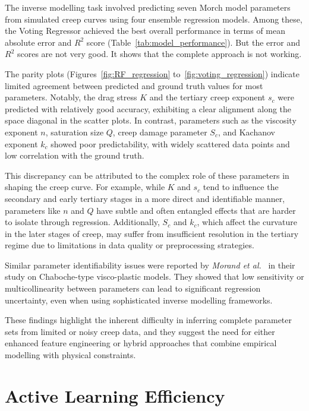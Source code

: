 \documentclass[class=scrbook, crop=false]{standalone}
\begin{document}
The inverse modelling task involved predicting seven Morch model parameters from simulated creep curves using four ensemble regression models. Among these, the Voting Regressor achieved the best overall performance in terms of mean absolute error and $R^2$ score (Table~\ref{tab:model_performance}). But the error and $R^2$ scores are not very good. It shows that the complete approach is not working. 

The parity plots (Figures~\ref{fig:RF_regression} to~\ref{fig:voting_regression}) indicate limited agreement between predicted and ground truth values for most parameters. Notably, the drag stress $K$ and the tertiary creep exponent $s_c$ were predicted with relatively good accuracy, exhibiting a clear alignment along the space diagonal in the scatter plots. In contrast, parameters such as the viscosity exponent $n$, saturation size $Q$, creep damage parameter $S_c$, and Kachanov exponent $k_c$ showed poor predictability, with widely scattered data points and low correlation with the ground truth.

This discrepancy can be attributed to the complex role of these parameters in shaping the creep curve. For example, while $K$ and $s_c$ tend to influence the secondary and early tertiary stages in a more direct and identifiable manner, parameters like $n$ and $Q$ have subtle and often entangled effects that are harder to isolate through regression. Additionally, $S_c$ and $k_c$, which affect the curvature in the later stages of creep, may suffer from insufficient resolution in the tertiary regime due to limitations in data quality or preprocessing strategies.

Similar parameter identifiability issues were reported by \textit{Morand et al.}~\cite{morand2024data} in their study on Chaboche-type visco-plastic models. They showed that low sensitivity or multicollinearity between parameters can lead to significant regression uncertainty, even when using sophisticated inverse modelling frameworks.

These findings highlight the inherent difficulty in inferring complete parameter sets from limited or noisy creep data, and they suggest the need for either enhanced feature engineering or hybrid approaches that combine empirical modelling with physical constraints.

\section{Active Learning Efficiency}
\end{document}
